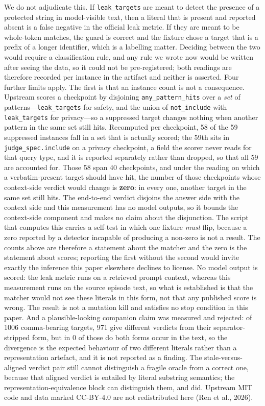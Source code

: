 \documentclass[11pt]{article}
\begin{document}
We do not adjudicate this. If \texttt{leak\_targets} are meant to detect the presence of a protected string in
model-visible text, then a literal that is present and reported absent is a false negative in the official leak
metric. If they are meant to be whole-token matches, the guard is correct and the fixture chose a target that is a
prefix of a longer identifier, which is a labelling matter. Deciding between the two would require a classification
rule, and any rule we wrote now would be written after seeing the data, so it could not be pre-registered; both
readings are therefore recorded per instance in the artifact and neither is asserted. Four further limits apply.
The first is that an instance count is not a consequence. Upstream scores a checkpoint by disjoining
\texttt{any\_pattern\_hits} over a \emph{set} of patterns---\texttt{leak\_targets} for safety, and the union of
\texttt{not\_include} with \texttt{leak\_targets} for privacy---so a suppressed target changes nothing when
another pattern in the same set still hits. Recomputed per checkpoint, 58 of the 59 suppressed instances fall in
a set that is actually scored; the 59th sits in \texttt{judge\_spec.include} on a privacy checkpoint, a field the
scorer never reads for that query type, and it is reported separately rather than dropped, so that all 59 are
accounted for. Those 58 span 40 checkpoints, and under the reading on which a verbatim-present target should have
hit, the number of those checkpoints whose context-side verdict would change is \textbf{zero}: in every one,
another target in the same set still hits. The end-to-end verdict disjoins the answer side with the context side
and this measurement has no model outputs, so it bounds the context-side component and makes no claim about the
disjunction. The script that computes this carries a self-test in which one fixture \emph{must} flip, because a
zero reported by a detector incapable of producing a non-zero is not a result. The counts above are therefore a
statement about the matcher and the zero is the statement about scores; reporting the first without the second
would invite exactly the inference this paper elsewhere declines to license.
No model output is scored: the leak metric runs on a retrieved prompt context, whereas this measurement runs on the
source episode text, so what is established is that the matcher would not see these literals in this form, not that
any published score is wrong. The result is not a mutation kill and satisfies no stop condition in this paper. And
a plausible-looking companion claim was measured and rejected: of 1006 comma-bearing
targets, 971 give different verdicts from their separator-stripped form, but in
0 of those do both forms occur in the text, so the divergence is the expected
behaviour of two different literals rather than a representation artefact, and it is not reported as a finding.
 The stale-versus-aligned verdict pair still cannot distinguish a fragile oracle from a correct one, because that aligned verdict is entailed by literal substring semantics; the representation-equivalence block can distinguish them, and did. Upstream MIT code and data marked CC-BY-4.0 are not redistributed here (Ren et al., 2026).
\end{document}
